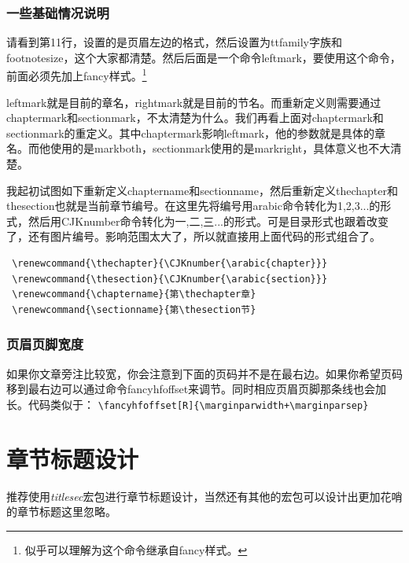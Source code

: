\documentclass[11pt,oneside]{book}
\begin{document}
\begin{common-format}
\subsubsection{一些基础情况说明}
请看到第11行，设置的是页眉左边的格式，然后设置为ttfamily字族和footnotesize，这个大家都清楚。然后后面是一个命令leftmark，要使用这个命令，前面必须先加上fancy样式。\footnote{似乎可以理解为这个命令继承自fancy样式。}

leftmark就是目前的章名，rightmark就是目前的节名。而重新定义则需要通过chaptermark和sectionmark，不太清楚为什么。我们再看上面对chaptermark和sectionmark的重定义。其中chaptermark影响leftmark，他的参数就是具体的章名。而他使用的是markboth，sectionmark使用的是markright，具体意义也不大清楚。

我起初试图如下重新定义chaptername和sectionname，然后重新定义thechapter和thesection也就是当前章节编号。在这里先将编号用arabic命令转化为1,2,3...的形式，然后用CJKnumber命令转化为一,二,三...的形式。可是目录形式也跟着改变了，还有图片编号。影响范围太大了，所以就直接用上面代码的形式组合了。
\begin{Verbatim}
 \renewcommand{\thechapter}{\CJKnumber{\arabic{chapter}}}
 \renewcommand{\thesection}{\CJKnumber{\arabic{section}}}
 \renewcommand{\chaptername}{第\thechapter章}
 \renewcommand{\sectionname}{第\thesection节}
\end{Verbatim}

\subsubsection{页眉页脚宽度}
如果你文章旁注比较宽，你会注意到下面的页码并不是在最右边。如果你希望页码移到最右边可以通过命令fancyhfoffset来调节。同时相应页眉页脚那条线也会加长。代码类似于：
\verb|\fancyhfoffset[R]{\marginparwidth+\marginparsep}|


\section{章节标题设计}
推荐使用\emph{titlesec}宏包进行章节标题设计，当然还有其他的宏包可以设计出更加花哨的章节标题这里忽略。


\end{common-format}
\end{document}
